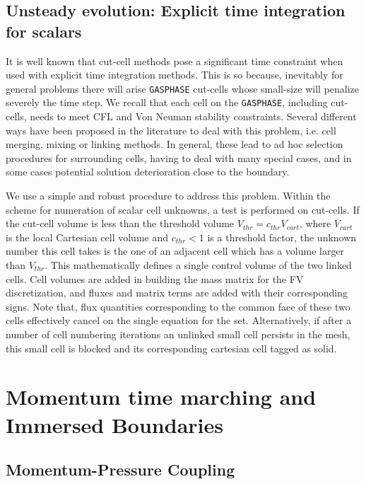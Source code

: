 \subsection{Unsteady evolution: Explicit time integration for scalars} \label{sec:exscl}

It is well known that cut-cell methods pose a significant time constraint when used with explicit time integration methods.
This is so because, inevitably for general problems there will arise \texttt{GASPHASE} cut-cells whose small-size will penalize
severely the time step. We recall that each cell on the \texttt{GASPHASE}, including cut-cells, needs to meet CFL and Von Neuman stability constraints. Several different ways have been proposed in the literature to deal with this problem, i.e. cell merging, mixing or linking methods. In general, these lead to ad hoc selection procedures for surrounding cells, having to deal with many special cases, and in some cases potential solution deterioration close to the boundary.

We use a simple and robust procedure to address this problem. Within the scheme for numeration of scalar cell unknowns, a test is performed on cut-cells. If the cut-cell volume is less than the threshold volume $V_{thr}= c_{thr} V_{cart}$, where $V_{cart}$ is the local Cartesian cell volume and $c_{thr}<1$ is a threshold factor, the unknown number this cell takes is the one of an adjacent cell which has a volume larger than $V_{thr}$. This mathematically defines a single control volume of the two linked cells. Cell volumes are added in building the mass matrix for the FV discretization, and fluxes and matrix terms are added with their corresponding signs. Note that, flux quantities corresponding to the common face of these two cells effectively cancel on the single equation for the set.
Alternatively, if after a number of cell numbering iterations an unlinked small cell persists in the mesh, this small cell is blocked and its corresponding cartesian cell tagged as solid.

\section{Momentum time marching and Immersed Boundaries}

\subsection{Momentum-Pressure Coupling}

